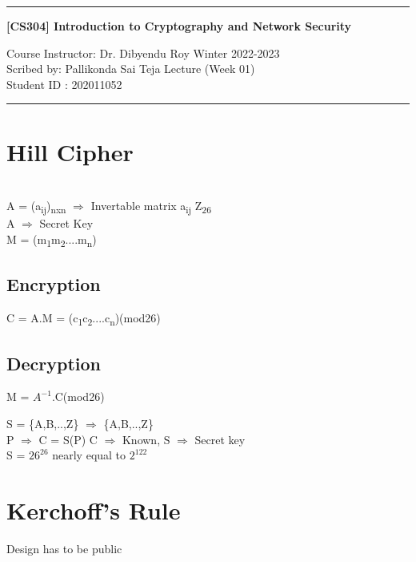 \documentclass[11pt]{article}
\begin{document}
	\noindent
	\rule{\textwidth}{1pt}
	\begin{center}
		{\bf [CS304] Introduction to Cryptography and Network Security}
	\end{center}
	Course Instructor: Dr. Dibyendu Roy \hfill Winter 2022-2023\\
	Scribed by: Pallikonda Sai Teja \hfill Lecture (Week 01)\\
	Student ID : 202011052
	\\
	\rule{\textwidth}{1pt}
	\section{Hill Cipher} 
	\\ 
	A = (a\textsubscript{ij})\textsubscript{nxn} \hspace{0.2cm} $\Rightarrow$ Invertable matrix \hspace{0.2cm} a\textsubscript{ij} \in Z\textsubscript{26}\\
	A $\Rightarrow$ Secret Key\\
	M = (m\textsubscript{1}m\textsubscript{2}....m\textsubscript{n})\\
	\subsection{Encryption}
	\begin{center}
		C = A.M = (c\textsubscript{1}c\textsubscript{2}....c\textsubscript{n})(mod26)
	\end{center}
	\subsection{Decryption}
	\begin{center}
		M = $A^{-1}$.C(mod26)
	\end{center}
	S = \{A,B,..,Z\} $\Rightarrow$ \{A,B,..,Z\}\\
	P $\Rightarrow$ C = S(P) \hspace{0.2cm} C $\Rightarrow$ Known, S $\Rightarrow$ Secret key\\
	S = $26^{26}$ nearly equal to $2^{122}$ \\
	\section{Kerchoff's Rule}
	Design has to be public\\
\end{document}
